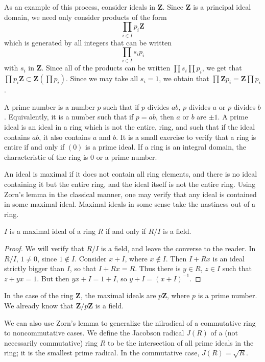 As an example of this process, consider ideals in $\mathbf{Z}$. Since $\mathbf{Z}$ is a principal ideal domain, we need only consider products of the form
%
\[ \prod_{i \in I} p_i \mathbf{Z} \]
%
which is generated by all integers that can be written
%
\[ \prod_{i \in I} s_i p_i \]
%
with $s_i$ in $\mathbf{Z}$. Since all of the products can be written $\prod s_i \prod p_i$, we get that $\prod p_i \mathbf{Z} \subset \mathbf{Z}(\prod p_i)$. Since we may take all $s_i = 1$, we obtain that $\prod \mathbf{Z} p_i = \mathbf{Z} \prod p_i$.

A prime number is a number $p$ such that if $p$ divides $ab$, $p$ divides $a$ or $p$ divides $b$. Equivalently, it is a number such that if $p = ab$, then $a$ or $b$ are $\pm 1$. A prime ideal is an ideal in a ring which is not the entire, ring, and such that if the ideal contains $ab$, it also contains $a$ and $b$. It is a small exercise to verify that a ring is entire if and only if $(0)$ is a prime ideal. If a ring is an integral domain, the characteristic of the ring is $0$ or a prime number.

An ideal is maximal if it does not contain all ring elements, and there is no ideal containing it but the entire ring, and the ideal itself is not the entire ring. Using Zorn's lemma in the classical manner, one may verify that any ideal is contained in some maximal ideal. Maximal ideals in some sense take the nastiness out of a ring.

\begin{theorem}
    $I$ is a maximal ideal of a ring $R$ if and only if $R/I$ is a field.
\end{theorem}
\begin{proof}
    We will verify that $R/I$ is a field, and leave the converse to the reader. In $R/I$, $1 \neq 0$, since $1 \not\in I$. Consider $x + I$, where $x \not\in I$. Then $I + Rx$ is an ideal strictly bigger than $I$, so that $I + Rx = R$. Thus there is $y \in R$, $z \in I$ such that $z + yx = 1$. But then $yx + I = 1 + I$, so $y + I = (x + I)^{-1}$.
\end{proof}

In the case of the ring $\mathbf{Z}$, the maximal ideals are $p\mathbf{Z}$, where $p$ is a prime number. We already know that $\mathbf{Z}/p\mathbf{Z}$ is a field.

We can also use Zorn's lemma to generalize the nilradical of a commutative ring to noncommutative cases. We define the Jacobson radical $J(R)$ of a (not necessarily commutative) ring $R$ to be the intersection of all prime ideals in the ring; it is the smallest prime radical. In the commutative case, $J(R) = \sqrt{R}$.

